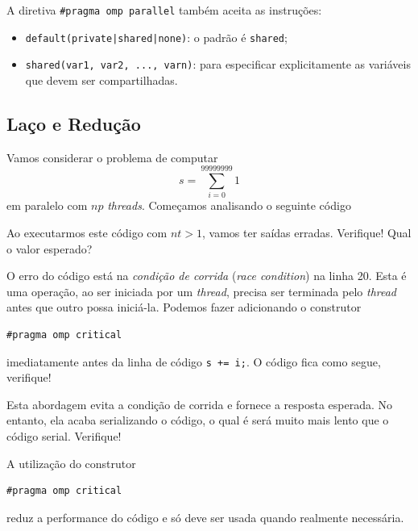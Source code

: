 \begin{obs}
  A diretiva \verb+#pragma omp parallel+ também aceita as instruções:
  \begin{itemize}
  \item \verb+default(private|shared|none)+: o padrão é \verb+shared+;
  \item \verb+shared(var1, var2, ..., varn)+: para especificar explicitamente as variáveis que devem ser compartilhadas. 
  \end{itemize}
\end{obs}

\subsection{Laço e Redução}

Vamos considerar o problema de computar
\begin{equation}
  s = \sum_{i=0}^{99999999} 1
\end{equation}
em paralelo com $np$ {\it threads}. Começamos analisando o seguinte código



Ao executarmos este código com $nt > 1$, vamos ter saídas erradas. Verifique! Qual o valor esperado?

O erro do código está na \emph{condição de corrida} ({\it race condition}) na linha 20. Esta é uma operação, ao ser iniciada por um {\it thread}, precisa ser terminada pelo {\it thread} antes que outro possa iniciá-la. Podemos fazer adicionando o construtor
\begin{verbatim}
#pragma omp critical
\end{verbatim}
imediatamente antes da linha de código \verb-s += i;-. O código fica como segue, verifique!



Esta abordagem evita a condição de corrida e fornece a resposta esperada. No entanto, ela acaba serializando o código, o qual é será muito mais lento que o código serial. Verifique!

\begin{obs}
  A utilização do construtor
\begin{verbatim}
#pragma omp critical
\end{verbatim}
  reduz a performance do código e só deve ser usada quando realmente necessária.
\end{obs}

